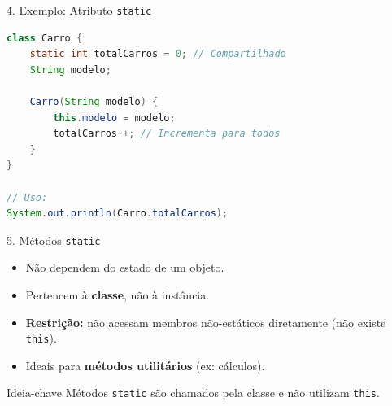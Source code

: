 \documentclass[9pt]{beamer}
\begin{document}
\begin{frame}[fragile]{4. Exemplo: Atributo \texttt{static}}
\begin{lstlisting}[language=Java, caption=Contador Global]
class Carro {
    static int totalCarros = 0; // Compartilhado
    String modelo;

    Carro(String modelo) {
        this.modelo = modelo;
        totalCarros++; // Incrementa para todos
    }
}

// Uso:
System.out.println(Carro.totalCarros); 
\end{lstlisting}
\end{frame}
\begin{frame}{5. Métodos \texttt{static}}

\begin{itemize}
    \item Não dependem do estado de um objeto.
    \item Pertencem à \textbf{classe}, não à instância.
    \item \textbf{Restrição:} não acessam membros não-estáticos diretamente (não existe \texttt{this}).
    \item Ideais para \textbf{métodos utilitários} (ex: cálculos).
\end{itemize}

\vspace{0.3cm}

\begin{center}
\end{center}

\vspace{0.2cm}

\begin{block}{Ideia-chave}
Métodos \texttt{static} são chamados pela classe e não utilizam \texttt{this}.
\end{block}

\end{frame}
\end{document}
